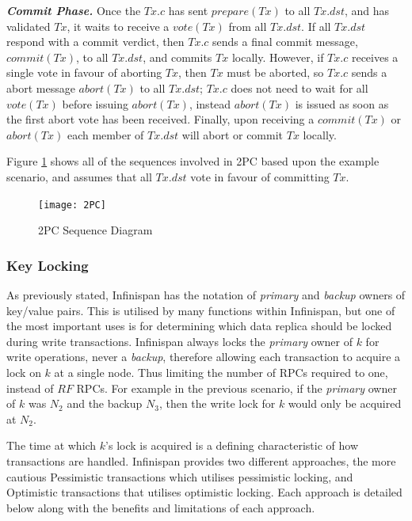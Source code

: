 	       \textbf{\emph{Commit Phase.}}  Once the $Tx.c$ has sent $prepare(Tx)$ to all $Tx.dst$, and has validated $Tx$, it waits to receive a $vote(Tx)$ from all $Tx.dst$.  If all $Tx.dst$ respond with a commit verdict, then $Tx.c$ sends a final commit message, $commit(Tx)$, to all $Tx.dst$, and commits $Tx$ locally.  However, if $Tx.c$ receives a single vote in favour of aborting $Tx$, then $Tx$ must be aborted, so $Tx.c$ sends a abort message $abort(Tx)$ to all $Tx.dst$; $Tx.c$ does not need to wait for all $vote(Tx)$ before issuing $abort(Tx)$, instead $abort(Tx)$ is issued as soon as the first abort vote has been received.  Finally, upon receiving a $commit(Tx)$ or $abort(Tx)$ each member of $Tx.dst$ will abort or commit $Tx$ locally.  
	       
	       Figure \ref{fig:2PC} shows all of the sequences involved in 2PC based upon the example scenario, and assumes that all $Tx.dst$ vote in favour of committing $Tx$.  
	       	       
            \begin{figure}[htbp!] 
                \centering    
                \texttt{[image: 2PC]}
                \caption[Two-phase Commit Protocol]{2PC Sequence Diagram}
                \label{fig:2PC}
            \end{figure}
            
	        \subsubsection*{Key Locking}
	        As previously stated, Infinispan has the notation of \emph{primary} and \emph{backup} owners of key/value pairs.  This is utilised by many functions within Infinispan, but one of the most important uses is for determining which data replica should be locked during write transactions.  Infinispan always locks the \emph{primary} owner of $k$ for write operations, never a \emph{backup}, therefore allowing each transaction to acquire a lock on $k$ at a single node.  Thus limiting the number of RPCs required to one, instead of $RF$ RPCs. For example in the previous scenario, if the \emph{primary} owner of $k$ was $N_2$ and the backup $N_3$, then the write lock for $k$ would only be acquired at $N_2$.  
	        
	        The time at which $k$'s lock is acquired is a defining characteristic of how transactions are handled.  Infinispan provides two different approaches, the more cautious Pessimistic transactions which utilises pessimistic locking, and Optimistic transactions that utilises optimistic locking.  Each approach is detailed below along with the benefits and limitations of each approach.  
	         
